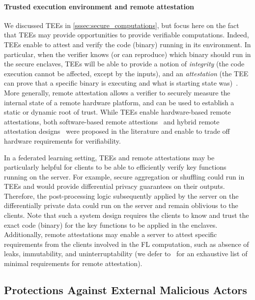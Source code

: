 \paragraph{Trusted execution environment and remote attestation} We discussed TEEs in \cref{sssec:secure_computations}, but focus here on the fact that TEEs may provide opportunities to provide verifiable computations.  Indeed, TEEs enable to attest and verify the code (binary) running in its environment.  In particular, when the verifier knows (or can reproduce) which binary should run in the secure enclaves, TEEs will be able to provide a notion of \emph{integrity} (the code execution cannot be affected, except by the inputs), and an \emph{attestation} (the TEE can prove that a specific binary is executing and what is starting state was)~\cite{subramanyan2017formal, DBLP:conf/eurosp/TramerZLHJS17}. More generally, remote attestation allows a verifier to securely measure the internal state of a remote hardware platform, and can be used to establish a static or dynamic root of trust. While TEEs enable hardware-based remote attestations, both software-based remote attestions~\cite{DBLP:series/ais/SeshadriLPDK07} and hybrid remote attestation designs~\cite{DBLP:conf/ndss/EldefrawyTFP12,DBLP:conf/eurosys/KoeberlSSV14} were proposed in the literature and enable to trade off hardware requirements for verifiability.

In a federated learning setting, TEEs and remote attestations may be particularly helpful for clients to be able to efficiently verify key functions running on the server. For example, secure aggregation or shuffling could run in TEEs and would provide differential privacy guarantees on their outputs. Therefore, the post-processing logic subsequently applied by the server on the differentially private data could run on the server and remain oblivious to the clients. Note that such a system design requires the clients to know and trust the exact code (binary) for the key functions to be applied in the enclaves. Additionally, remote attestations may enable a server to attest specific requirements from the clients involved in the FL computation, such as absence of leaks, immutability, and uninterruptability (we defer to~\cite{DBLP:conf/date/FrancillonNRT14} for an exhaustive list of minimal requirements for remote attestation). 



\subsection{Protections Against External Malicious Actors}
\label{ssec:adv_clients_analysts}

